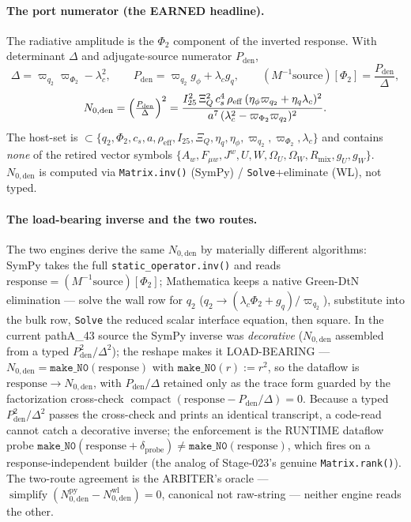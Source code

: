 \paragraph{The port numerator (the EARNED headline).}
The radiative amplitude is the \(\Phi_2\) component of the inverted response. With determinant
\(\Delta\) and adjugate\(\cdot\)source numerator \(P_{\mathrm{den}}\),
\[
  \Delta=\varpi_{q_2}\varpi_{\Phi_2}-\lambda_c^2,\qquad
  P_{\mathrm{den}}=\varpi_{q_2}g_\phi+\lambda_c g_q,\qquad
  (M^{-1}\mathrm{source})[\Phi_2]=\frac{P_{\mathrm{den}}}{\Delta},
\]
\[
  N_{0,\mathrm{den}}=\Bigl(\tfrac{P_{\mathrm{den}}}{\Delta}\Bigr)^2
  =\frac{I_{25}^2\,\Xi_Q^2\,c_s^4\,\rho_{\mathrm{eff}}\,(\eta_\phi\varpi_{q_2}+\eta_q\lambda_c)^2}
        {a^7\,(\lambda_c^2-\varpi_{\Phi_2}\varpi_{q_2})^2}.
\]
The host-set is \(\subset\{q_2,\Phi_2,c_s,a,\rho_{\mathrm{eff}},I_{25},\Xi_Q,\eta_q,\eta_\phi,
\varpi_{q_2},\varpi_{\Phi_2},\lambda_c\}\) and contains \emph{none} of the retired vector
symbols \(\{A_w,F_{\mu w},J^w,U,W,\Omega_U,\Omega_W,R_{\mathrm{mix}},g_U,g_W\}\).
\(N_{0,\mathrm{den}}\) is computed via \texttt{Matrix.inv()} (SymPy) / \texttt{Solve}+eliminate
(WL), not typed.

\paragraph{The load-bearing inverse and the two routes.}
The two engines derive the same \(N_{0,\mathrm{den}}\) by materially different algorithms: SymPy
takes the full \texttt{static\_operator.inv()} and reads \(\mathrm{response}=(M^{-1}\mathrm{source})[\Phi_2]\);
Mathematica keeps a native Green-DtN elimination --- solve the wall row for \(q_2\)
(\(q_2\to(\lambda_c\Phi_2+g_q)/\varpi_{q_2}\)), substitute into the bulk row, \texttt{Solve} the
reduced scalar interface equation, then square. In the current pathA\_43 source the SymPy inverse
was \emph{decorative} (\(N_{0,\mathrm{den}}\) assembled from a typed \(P_{\mathrm{den}}^2/\Delta^2\));
the reshape makes it LOAD-BEARING --- \(N_{0,\mathrm{den}}=\texttt{make\_N0}(\mathrm{response})\)
with \(\texttt{make\_N0}(r):=r^2\), so the dataflow is \(\mathrm{response}\to N_{0,\mathrm{den}}\),
with \(P_{\mathrm{den}}/\Delta\) retained only as the trace form guarded by the factorization
cross-check \(\operatorname{compact}(\mathrm{response}-P_{\mathrm{den}}/\Delta)=0\). Because a
typed \(P_{\mathrm{den}}^2/\Delta^2\) passes the cross-check and prints an identical transcript, a
code-read cannot catch a decorative inverse; the enforcement is the RUNTIME dataflow probe
\(\texttt{make\_N0}(\mathrm{response}+\delta_{\mathrm{probe}})\ne\texttt{make\_N0}(\mathrm{response})\),
which fires on a response-independent builder (the analog of Stage-023's genuine
\texttt{Matrix.rank()}). The two-route agreement is the ARBITER's oracle ---
\(\operatorname{simplify}(N_{0,\mathrm{den}}^{\mathrm{py}}-N_{0,\mathrm{den}}^{\mathrm{wl}})=0\),
canonical not raw-string --- neither engine reads the other.

